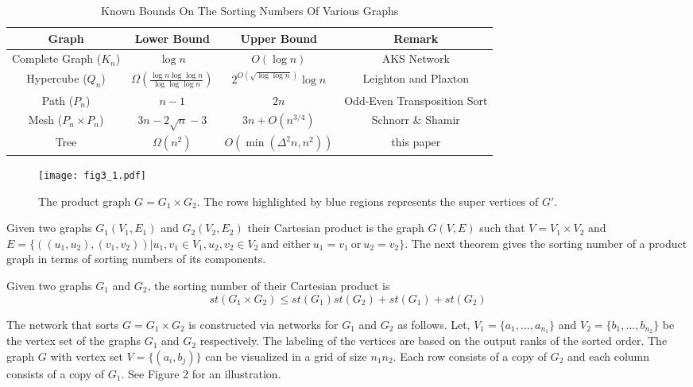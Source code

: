 \documentclass[runningheads,a4paper]{llncs}
\begin{document}
\begin{table}[ht]
	\caption{Known Bounds On The Sorting Numbers Of Various Graphs} \centering \begin{tabular}{c c c c} \hline\hline Graph & Lower Bound & Upper Bound & Remark \\ [0.5ex] \hline Complete Graph ($K_n$) & $\log n$ & $O(\log n)$ & AKS Network \cite{1}\\ Hypercube ($Q_n$) & $ \Omega(\frac{\log n \log\log n}{\log \log \log n}) $\cite{11} &  $2^{O(\sqrt{\log\log n})}\log n$ & Leighton and Plaxton \cite{13} \\
		Path ($P_n$) & $n-1$ & $2n$ & Odd-Even Transposition Sort \\
		Mesh ($P_n \times P_n$) & $3n - 2{\sqrt{n}}-3$ & $3n+O(n^{3/4})$ & Schnorr \& Shamir \cite{4}\\ 
		Tree & $ \Omega(n^2)$ & $ O(\min(\Delta^2n,n^2)) $& this paper\\[1ex] \hline \end{tabular}
	\label{table:nonlin} \end{table}


\begin{figure}[h]
	\texttt{[image: fig3\_1.pdf]}
	\centering
	\caption{The product graph $G = G_1\times G_2$. The rows highlighted by blue regions represents the super vertices of $G'$. } 
\end{figure}

\noindent Given two graphs $G_1(V_1,E_1)$ and $G_2(V_2,E_2)$ their Cartesian product is the graph $G(V,E)$ such that $V = V_1 \times V_2$ and $E = \{((u_1,u_2),(v_1,v_2))| u_1,v_1 \in V_1, u_2,v_2 \in V_2\ \mbox{and either}\ u_1=v_1\ \mbox{or}\ u_2=v_2  \}$. The next theorem gives the sorting number of a product graph in terms of sorting numbers of its components.
\begin{theorem}
	Given two graphs $G_1$ and $G_2$, the sorting number of their Cartesian product is $$st(G_1 \times G_2) \le st(G_1)st(G_2) + st(G_1)+ st(G_2)$$
\end{theorem} 


\noindent The network that sorts $G = G_1 \times G_2$ is constructed via networks for $G_1$ and $G_2$ as follows. Let, $V_1 = \{a_1,...,a_{n_1}\}$ and $V_2=\{b_1,...,b_{n_2}\}$ be the vertex set of the graphs $G_1$ and $G_2$ respectively. The labeling of the vertices are based on the output ranks of the sorted order. The graph $G$ with vertex set $V=\{(a_i,b_j)\}$ can be visualized in a grid of size $n_1n_2$. Each row consists of a copy of $G_2$ and each column consists of a copy of $G_1$. See Figure 2 for an illustration. 
\end{document}
